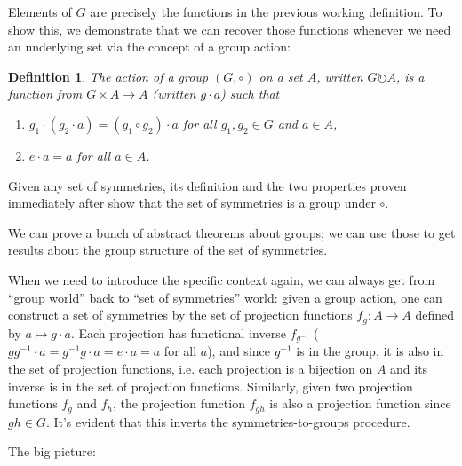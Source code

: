 \documentclass{article}
\newtheorem*{df}{Definition}
\begin{document}
Elements of $G$ are precisely the functions in the previous working definition.
To show this, we demonstrate that we can recover those functions whenever we need an underlying set via the concept of a group action:

\begin{df}
  The action of a group $(G, \circ)$ on a set $A$, written $G\circlearrowright A$, is a function from $G\times A\to A$ (written $g\cdot a$) such that
  \begin{enumerate}
  \item $g_{1}\cdot (g_{2}\cdot a) = (g_{1}\circ g_{2})\cdot a$ for all $g_{1},g_{2}\in G$ and $a\in A$,
  \item $e \cdot a = a$ for all $a\in A$.
  \end{enumerate}
\end{df}

Given any set of symmetries, its definition and the two properties proven immediately after show that the set of symmetries is a group under $\circ$.

We can prove a bunch of abstract theorems about groups; we can use those to get results about the group structure of the set of symmetries.

When we need to introduce the specific context again, we can always get from ``group world'' back to ``set of symmetries'' world:
given a group action, one can construct a set of symmetries by the set of projection functions $f_{g}: A\to A$ defined by $a\mapsto g\cdot a$.
Each projection has functional inverse $f_{g^{-1}}$ ($gg ^{-1}\cdot a=g^{-1}g\cdot a = e\cdot a = a$ for all $a$), and since $g^{-1}$ is in the group,
it is also in the set of projection functions, i.e. each projection is a bijection on $A$ and its inverse is in the set of projection functions.
Similarly, given two projection functions $f_{g}$ and $f_{h}$, the projection function $f_{gh}$ is also a projection function since $gh\in G$.
It's evident that this inverts the symmetries-to-groups procedure.

The big picture:

\begin{center}
\end{center}
\end{document}
